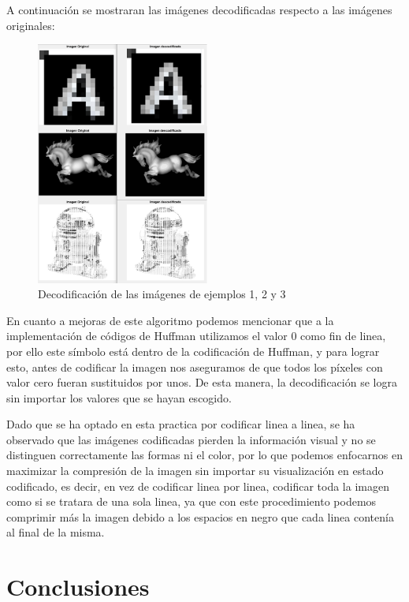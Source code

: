 \documentclass[12pt,twoside]{article}
\begin{document}
    A continuación se mostraran las imágenes decodificadas respecto a las imágenes originales:
    
    \begin{figure}[H]
            \centering
            \includegraphics[height=8cm]{imagenes/a8.png}
            \caption{Decodificación de las imágenes de ejemplos 1, 2 y 3}
        \end{figure}
    
    \newpage
    En cuanto a mejoras de este algoritmo podemos mencionar que a la implementación de códigos de Huffman utilizamos el valor 0 como fin de linea, por ello este símbolo está dentro de la codificación de Huffman, y para lograr esto, antes de codificar la imagen nos aseguramos de que todos los píxeles con valor cero fueran sustituidos por unos. De esta manera, la decodificación se logra sin importar los valores que se hayan escogido.
    
    Dado que se ha optado en esta practica por codificar linea a linea, se ha observado que las imágenes codificadas pierden la información visual y no se distinguen correctamente las formas ni el color, por lo que podemos enfocarnos en maximizar la compresión de la imagen sin importar su visualización en estado codificado, es decir, en vez de codificar linea por linea, codificar toda la imagen como si se tratara de una sola linea, ya que con este procedimiento podemos comprimir más la imagen debido a los espacios en negro que cada linea contenía al final de la misma.
    
    \section{Conclusiones}
    
\end{document}
